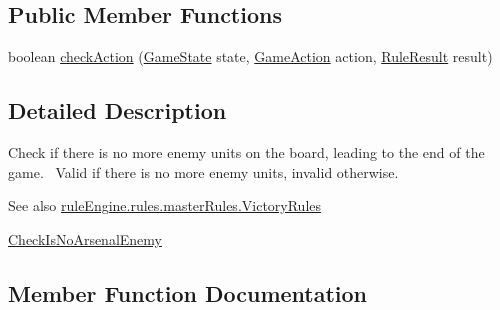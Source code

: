\subsection*{Public Member Functions}
\begin{DoxyCompactItemize}
\item 
boolean \mbox{\hyperlink{classrule_engine_1_1rules_1_1atomic_rules_1_1_check_is_no_enemy_a2a3e22e04dd8057b3a0c115957003964}{check\+Action}} (\mbox{\hyperlink{classgame_1_1game_state_1_1_game_state}{Game\+State}} state, \mbox{\hyperlink{classrule_engine_1_1_game_action}{Game\+Action}} action, \mbox{\hyperlink{classrule_engine_1_1_rule_result}{Rule\+Result}} result)
\end{DoxyCompactItemize}


\subsection{Detailed Description}
Check if there is no more enemy units on the board, leading to the end of the game.~\newline
 Valid if there is no more enemy units, invalid otherwise.~\newline
~\newline
 \begin{DoxySeeAlso}{See also}
\mbox{\hyperlink{classrule_engine_1_1rules_1_1master_rules_1_1_victory_rules}{rule\+Engine.\+rules.\+master\+Rules.\+Victory\+Rules}} 

\mbox{\hyperlink{classrule_engine_1_1rules_1_1atomic_rules_1_1_check_is_no_arsenal_enemy}{Check\+Is\+No\+Arsenal\+Enemy}} 
\end{DoxySeeAlso}


\subsection{Member Function Documentation}
\mbox{\label{classrule_engine_1_1rules_1_1atomic_rules_1_1_check_is_no_enemy_a2a3e22e04dd8057b3a0c115957003964}} 
